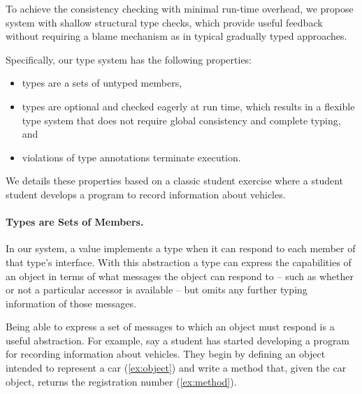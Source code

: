 To achieve the consistency checking with minimal run-time overhead,
we propose system with shallow structural type checks,
which provide useful feedback without requiring a blame mechanism
as in typical gradually typed approaches.


Specifically, our type system has the following properties:

\begin{itemize}
  \item types are a sets of untyped members,
  \item types are optional and checked eagerly at run time,
        which results in a flexible type system that does not require global
        consistency and complete typing, and
  \item violations of type annotations terminate execution.
\end{itemize}


We details these properties
based on a classic student exercise where a student student develops
a program to record information about vehicles.

\paragraph{Types are Sets of Members.}

In our system, a value implements a type when it
can respond to each member of that type's interface.
With this abstraction a type can express the capabilities
of an object in terms of what messages the object can respond to 
-- such as whether or not a particular accessor is available --
but omits any further typing information of those messages.

Being able to express a set of messages to which an object
must respond is a useful abstraction. For example, 
say a student has started developing a program for recording
information about vehicles. They begin by defining an object
intended to represent a car (\cref{ex:object}) and write a method that, 
given the car object,
returns the registration number (\cref{ex:method}).

